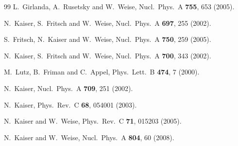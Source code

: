 \documentclass[aps,rmp,nofootinbib,twocolumn,floatfix]{revtex4}
\begin{document}
\begin{thebibliography}{99}
  L.~Girlanda, A.~Rusetsky and W.~Weise,
  Nucl.\ Phys.\  A {\bf 755}, 653 (2005).




  N.~Kaiser, S.~Fritsch and W.~Weise,
  Nucl.\ Phys.\  A {\bf 697}, 255 (2002).

  S.~Fritsch, N.~Kaiser and W.~Weise,
  Nucl.\ Phys.\  A {\bf 750}, 259 (2005).

  N.~Kaiser, S.~Fritsch and W.~Weise,
  Nucl.\ Phys.\  A {\bf 700}, 343 (2002).

  M.~Lutz, B.~Friman and C.~Appel,
  Phys.\ Lett.\  B {\bf 474}, 7 (2000).

  N.~Kaiser,
  Nucl.\ Phys.\  A {\bf 709}, 251 (2002).

  N.~Kaiser,
  Phys.\ Rev.\  C {\bf 68}, 054001 (2003).

  N.~Kaiser and W.~Weise,
  Phys.\ Rev.\  C {\bf 71}, 015203 (2005).

  N.~Kaiser and W.~Weise,
  Nucl.\ Phys.\  A {\bf 804}, 60 (2008).


\end{thebibliography}
\end{document}
